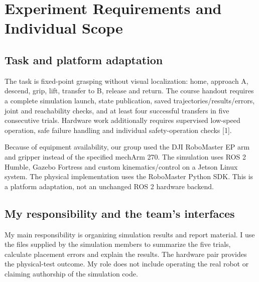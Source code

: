 \documentclass[11pt,a4paper]{article}
\begin{document}
\section{Experiment Requirements and Individual Scope}
\label{sec:scope}
\subsection{Task and platform adaptation}
The task is fixed-point grasping without visual localization: home, approach A,
descend, grip, lift, transfer to B, release and return. The course handout requires
a complete simulation launch, state publication, saved trajectories/results/errors,
joint and reachability checks, and at least four successful transfers in five
consecutive trials. Hardware work additionally requires supervised low-speed
operation, safe failure handling and individual safety-operation checks [1].

Because of equipment availability, our group used the DJI RoboMaster EP arm and
gripper instead of the specified mechArm 270. The simulation uses ROS 2 Humble,
Gazebo Fortress and custom kinematics/control on a Jetson Linux system. The
physical implementation uses the RoboMaster Python SDK. This is a platform
adaptation, not an unchanged ROS 2 hardware backend.

\subsection{My responsibility and the team's interfaces}
My main responsibility is organizing simulation results and report material.
I use the files supplied by the simulation members to summarize the five trials,
calculate placement errors and explain the results. The hardware pair provides
the physical-test outcome. My role does not include operating the real robot or
claiming authorship of the simulation code.
\end{document}
